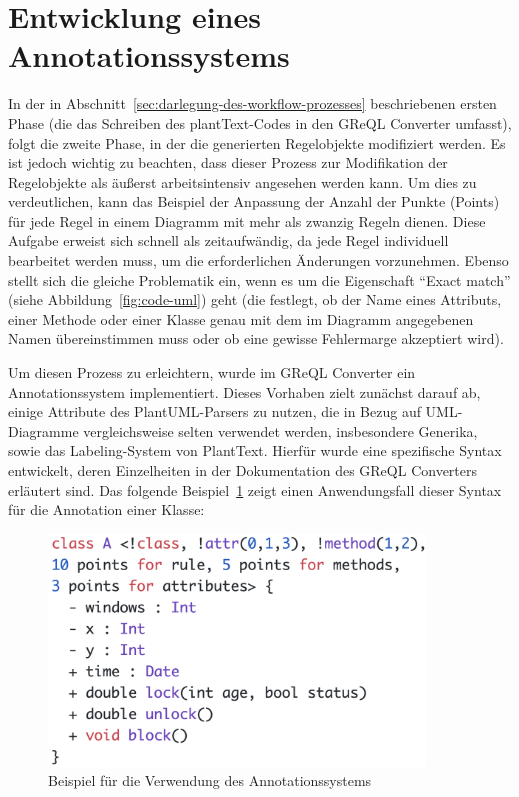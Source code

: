 \section{Entwicklung eines Annotationssystems}
In der in Abschnitt~\ref{sec:darlegung-des-workflow-prozesses} beschriebenen ersten Phase (die das Schreiben des
plantText-Codes in den GReQL Converter umfasst), folgt die zweite Phase, in der die generierten Regelobjekte modifiziert
werden. Es ist jedoch wichtig zu beachten, dass dieser Prozess zur Modifikation der Regelobjekte als äußerst
arbeitsintensiv angesehen werden kann. Um dies zu verdeutlichen, kann das Beispiel der Anpassung der Anzahl der Punkte (Points)
für jede Regel in einem Diagramm mit mehr als zwanzig Regeln dienen. Diese Aufgabe erweist sich schnell als zeitaufwändig,
da jede Regel individuell bearbeitet werden muss, um die erforderlichen Änderungen vorzunehmen. Ebenso stellt sich die
gleiche Problematik ein, wenn es um die Eigenschaft ``Exact match'' (siehe Abbildung~\ref{fig:code-uml}) geht (die festlegt, ob
der Name eines Attributs, einer Methode oder einer Klasse genau mit dem im Diagramm angegebenen Namen übereinstimmen
muss oder ob eine gewisse Fehlermarge akzeptiert wird).

Um diesen Prozess zu erleichtern, wurde im GReQL Converter ein Annotationssystem implementiert. Dieses Vorhaben zielt
zunächst darauf ab, einige Attribute des PlantUML-Parsers zu nutzen, die in Bezug auf UML-Diagramme vergleichsweise
selten verwendet werden, insbesondere Generika, sowie das Labeling-System von PlantText. Hierfür wurde eine spezifische
Syntax entwickelt, deren Einzelheiten in der Dokumentation des GReQL Converters erläutert sind. Das folgende Beispiel~\ref{fig:annotation}
zeigt einen Anwendungsfall dieser Syntax für die Annotation einer Klasse:

\begin{figure}[h!]
    \centering
    \includegraphics[width=10cm]{images/annotation}
    \caption{Beispiel für die Verwendung des Annotationssystems}
    \label{fig:annotation}
\end{figure}

